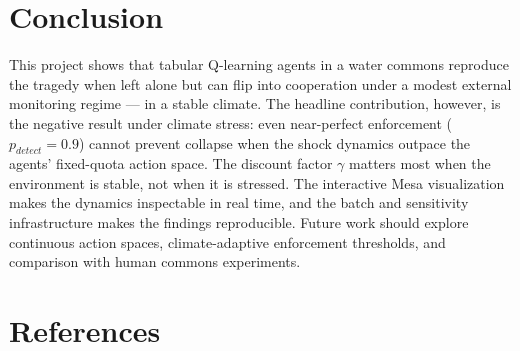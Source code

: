 \documentclass[12pt, a4paper]{article}
\begin{document}
\section{Conclusion}

This project shows that tabular Q-learning agents in a water commons reproduce
the tragedy when left alone but can flip into cooperation under a modest
external monitoring regime --- in a stable climate. The headline contribution,
however, is the negative result under climate stress: even near-perfect
enforcement ($p_{detect}=0.9$) cannot prevent collapse when the shock dynamics
outpace the agents' fixed-quota action space. The discount factor $\gamma$
matters most when the environment is stable, not when it is stressed. The
interactive Mesa visualization makes the dynamics inspectable in real time,
and the batch and sensitivity infrastructure makes the findings reproducible.
Future work should explore continuous action spaces, climate-adaptive
enforcement thresholds, and comparison with human commons experiments.

\newpage
\section*{References}
\end{document}
